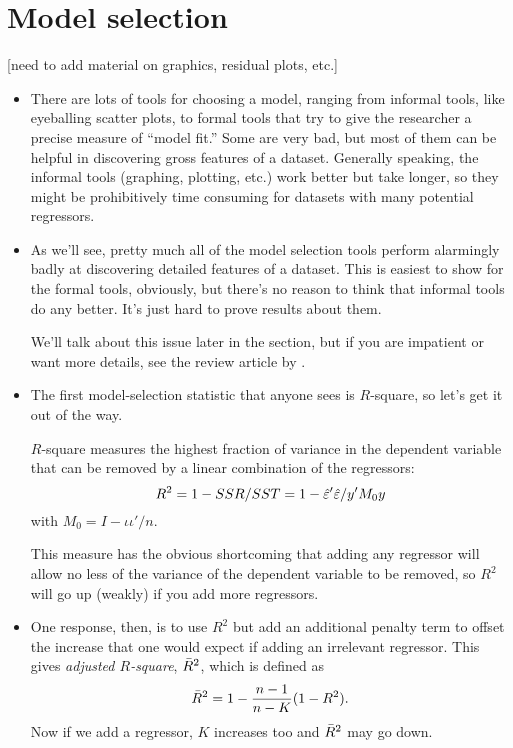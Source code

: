 \section{Model selection}

[need to add material on graphics, residual plots, etc.]

\begin{itemize}[leftmargin=0pt]

\item There are lots of tools for choosing a model, ranging from
  informal tools, like eyeballing scatter plots, to formal tools that
  try to give the researcher a precise measure of ``model fit.''  Some
  are very bad, but most of them can be helpful in discovering gross
  features of a dataset.  Generally speaking, the informal tools
  (graphing, plotting, etc.) work better but take longer, so they
  might be prohibitively time consuming for datasets with many
  potential regressors.

\item As we'll see, pretty much all of the model selection tools
  perform alarmingly badly at discovering detailed features of a
  dataset.  This is easiest to show for the formal tools, obviously,
  but there's no reason to think that informal tools do any better.
  It's just hard to prove results about them.

  We'll talk about this issue later in the section, but if you are
  impatient or want more details, see the review article by
  \citet{LP05}.

\item The first model-selection statistic that anyone sees is
  $R$-square, so let's get it out of the way.

  \begin{defn} $R$-square measures the highest
    fraction of variance in the dependent variable that can be removed
    by a linear combination of the regressors:
    \begin{equation*}
      R^2 = 1 - SSR/SST = 1 - \hat{\varepsilon}'\hat{\varepsilon}/y'M_0y
    \end{equation*}
    with $M_0 = I - \iota \iota' / n$.
  \end{defn}

  This measure has the obvious shortcoming that adding any regressor
  will allow no less of the variance of the dependent variable to be
  removed, so $R^2$ will go up (weakly) if you add more regressors.

\item One response, then, is to use $R^2$ but add an additional
  penalty term to offset the increase that one would expect if adding
  an irrelevant regressor.  This gives \emph{adjusted $R$-square},
  $\bar{R}^2$, which is defined as
  \begin{equation*}
    \bar{R}^2 = 1 - \frac{n-1}{n-K}(1-R^2).
  \end{equation*}
  Now if we add a regressor, $K$ increases too and $\bar{R}^2$ may go
  down.


\end{itemize}
